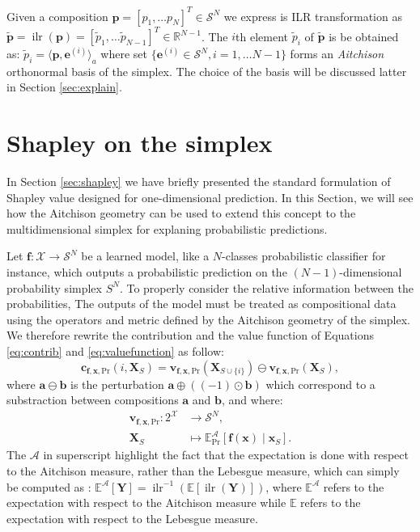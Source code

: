 \documentclass{article}
\theoremstyle{plain}
\theoremstyle{definition}
\theoremstyle{remark}
\DeclareMathOperator{\ilr}{ilr}
\begin{document}
Given a composition $\bm{p} = \left[ p_1,\dots p_N \right]^T \in \mathcal{S}^N$ we express is ILR transformation as $\tilde{\bm{p}} = \ilr \left( \bm{p} \right) = \left[ \tilde{p}_1,\dots \tilde{p}_{N-1} \right]^T \in \mathbb{R}^{N-1}$. The $i$th element $\tilde{p}_i$ of $\tilde{\bm{p}}$ is be obtained as: $\tilde{p}_i = \langle \bm{p}, \bm{e}^{(i)} \rangle_a$ where set $\{\bm{e}^{(i)} \in \mathcal{S}^N, i=1,\dots N-1\}$ forms an \emph{Aitchison} orthonormal basis of the simplex. The choice of the basis will be discussed latter in Section \ref{sec:explain}.


\section{Shapley on the simplex}

In Section \ref{sec:shapley} we have briefly presented the standard formulation of Shapley value designed for one-dimensional prediction. In this Section, we will see how the Aitchison geometry can be used to extend this concept to the multidimensional simplex for explaning probabilistic predictions.


Let $\bm{f}:\mathcal{X}\to\mathcal{S}^N$ be a learned model, like a $N$-classes probabilistic classifier for instance, which outputs a probabilistic prediction on the $(N-1)$-dimensional probability simplex $S^N$. To properly consider the relative information between the probabilities, The outputs of the model must be treated as compositional data using the operators and metric defined by the Aitchison geometry of the simplex. We therefore rewrite the contribution and the value function of Equations \ref{eq:contrib} and \ref{eq:valuefunction} as follow:
\begin{equation}
  \bm{c}_{\bm{f},\bm{x},\text{Pr}}(i,\bm{X}_S) = \bm{v}_{\bm{f},\bm{x},\text{Pr}}(\bm{X}_{S\cup\{i\}}) \ominus \bm{v}_{\bm{f},\bm{x},\text{Pr}}(\bm{X}_S),
\end{equation}
where $\bm{a}\ominus\bm{b}$ is the perturbation $\bm{a} \oplus \left( (-1)\odot \bm{b}\right)$ which correspond to a substraction between compositions $\bm{a}$ and $\bm{b}$, and where:
\begin{equation}
  \label{eq:valuefunctionsimplex}
  \begin{aligned}
    \bm{v}_{\bm{f},\bm{x},\text{Pr}}: 2^{\mathcal{X}} &\to \mathcal{S}^N,\\
    \bm{X}_S &\mapsto \mathbb{E}^{\mathcal{A}}_\text{Pr}[\bm{f}(\bm{x})\mid \bm{x}_S].
  \end{aligned}
\end{equation}
The $\mathcal{A}$ in superscript highlight the fact that the expectation is done with respect to the Aitchison measure, rather than the Lebesgue measure, which can simply be computed as \cite{pawlowskymodeling}: $\mathbb{E}^{\mathcal{A}}[\bm{Y}] = \ilr^{-1}\left( \mathbb{E} \left[ \ilr\left( \bm{Y} \right) \right] \right)$,
where $\mathbb{E}^{\mathcal{A}}$ refers to the expectation with respect to the Aitchison measure while $\mathbb{E}$ refers to the expectation with respect to the Lebesgue measure.
\end{document}
